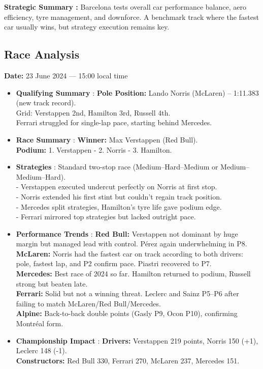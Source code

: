 \textbf{Strategic Summary :}
Barcelona tests overall car performance balance, aero efficiency, tyre management, and downforce. A benchmark track where the fastest car usually wins, but strategy execution remains key.


\subsection{Race Analysis}

\textbf{Date:} 23 June 2024 — 15:00 local time 

\begin{itemize}
    \item \textbf{Qualifying Summary} : \textbf{Pole Position:} Lando Norris (McLaren) – 1:11.383 (new track record). \\
    Grid: Verstappen 2nd, Hamilton 3rd, Russell 4th.\\
    Ferrari struggled for single-lap pace, starting behind Mercedes.
    
    \item \textbf{Race Summary} : \textbf{Winner:} Max Verstappen (Red Bull).\\
    \textbf{Podium:} 1. Verstappen - 2. Norris - 3. Hamilton.
    
    \item \textbf{Strategies} : Standard two-stop race (Medium–Hard–Medium or Medium–Medium–Hard).\\ 
     - Verstappen executed undercut perfectly on Norris at first stop. \\
     - Norris extended his first stint but couldn’t regain track position. \\
     - Mercedes split strategies, Hamilton’s tyre life gave podium edge. \\
     - Ferrari mirrored top strategies but lacked outright pace.\\
    
    \item \textbf{Performance Trends} : \textbf{Red Bull:} Verstappen not dominant by huge margin but managed lead with control. Pérez again underwhelming in P8. \\
    \textbf{McLaren:} Norris had the fastest car on track according to both drivers: pole, fastest lap, and P2 confirm pace. Piastri recovered to P7. \\
    \textbf{Mercedes:} Best race of 2024 so far. Hamilton returned to podium, Russell strong but beaten late. \\
    \textbf{Ferrari:} Solid but not a winning threat. Leclerc and Sainz P5–P6 after failing to match McLaren/Red Bull/Mercedes. \\
    \textbf{Alpine:} Back-to-back double points (Gasly P9, Ocon P10), confirming Montréal form.
    
    \item \textbf{Championship Impact} : \textbf{Drivers:} Verstappen 219 points, Norris 150 (+1), Leclerc 148 (-1).\\
    \textbf{Constructors:} Red Bull 330, Ferrari 270, McLaren 237, Mercedes 151.    
\end{itemize}

